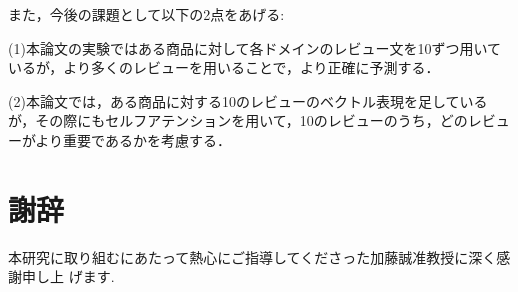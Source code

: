 \documentclass[dvipdfmx,twocolumn,10.5pt]{jsarticle}
\begin{document}
また，今後の課題として以下の2点をあげる:

(1)本論文の実験ではある商品に対して各ドメインのレビュー文を10ずつ用いているが，より多くのレビューを用いることで，より正確に予測する．

(2)本論文では，ある商品に対する10のレビューのベクトル表現を足しているが，その際にもセルフアテンションを用いて，10のレビューのうち，どのレビューがより重要であるかを考慮する．


\section{謝辞}\label{Acknowledgement}
本研究に取り組むにあたって熱心にご指導してくださった加藤誠准教授に深く感謝申し上 げます.

\vspace{2em}




\end{document}
